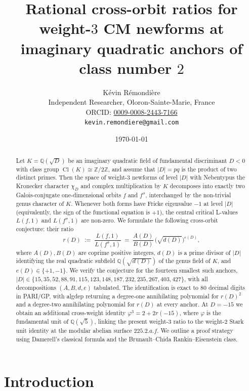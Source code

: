 \documentclass[11pt]{amsart}
\title[Rational cross-orbit ratios for weight-3 newforms]{Rational
cross-orbit ratios for weight-\(3\) CM newforms at imaginary quadratic
anchors of class number \(2\)}
\author[K. R\'emondi\`ere]{K\'evin R\'emondi\`ere\\
\small Independent Researcher, Oloron-Sainte-Marie, France\\
\small ORCID: \href{https://orcid.org/0009-0008-2443-7166}{0009-0008-2443-7166}\\
\small \texttt{kevin.remondiere@gmail.com}}
\date{\today}
\theoremstyle{definition}
\theoremstyle{remark}
\DeclareMathOperator{\Cl}{Cl}
\newcommand{\Q}{\mathbb{Q}}
\newcommand{\Z}{\mathbb{Z}}
\newcommand{\chiD}{\chi_D}
\begin{document}
\begin{abstract}
Let \(K = \Q(\sqrt{D})\) be an imaginary quadratic field of
fundamental discriminant \(D < 0\) with class group \(\Cl(K) \cong
\Z/2\Z\), and assume that \(|D| = p q\) is the product of two distinct
primes. Then the space of weight-\(3\) newforms of level \(|D|\) with
Nebentypus the Kronecker character \(\chiD\) and complex
multiplication by \(K\) decomposes into exactly two Galois-conjugate
one-dimensional orbits \(f\) and \(f^{\sigma}\), interchanged by the
non-trivial genus character of \(K\). Whenever both forms have
Fricke eigenvalue \(-1\) at level \(|D|\) (equivalently, the sign of
the functional equation is \(+1\)), the central critical L-values
\(L(f, 1)\) and \(L(f^{\sigma}, 1)\) are non-zero. We formulate the
following cross-orbit conjecture: their ratio
\[
   r(D)
   \;:=\;
   \frac{L(f, 1)}{L(f^{\sigma}, 1)}
   \;=\; \frac{A(D)}{B(D)}\,\bigl(\sqrt{d(D)}\bigr)^{e(D)} ,
\]
where \(A(D), B(D)\) are coprime positive integers, \(d(D)\) is a
prime divisor of \(|D|\) identifying the real quadratic subfield
\(\Q(\sqrt{d(D)})\) of the genus field of \(K\), and
\(e(D) \in \{+1, -1\}\). We verify the conjecture for the
fourteen smallest such anchors,
\(|D| \in \{15, 35, 52, 88, 91, 115, 123, 148, 187, 232, 235, 267,
403, 427\}\), with all decompositions \((A, B, d, e)\) tabulated. The
identification is exact to \(80\) decimal digits in PARI/GP, with
\textsf{algdep} returning a degree-one annihilating polynomial for
\(r(D)^{2}\) and a degree-two annihilating polynomial for \(r(D)\) at
every anchor. At \(D = -15\) we obtain an additional cross-weight
identity \(\varphi^{3} = 2 + 2 r(-15)\), where \(\varphi\) is the
fundamental unit of \(\Q(\sqrt{5})\), linking the present
weight-\(3\) ratio to the weight-\(2\) Stark unit identity at the
modular abelian surface \(225.2.a.f\). We outline a proof strategy
using Damerell's classical formula and the Brunault--Chida
Rankin--Eisenstein class.
\end{abstract}

\maketitle


\section{Introduction}\label{sec:intro}
\end{document}
